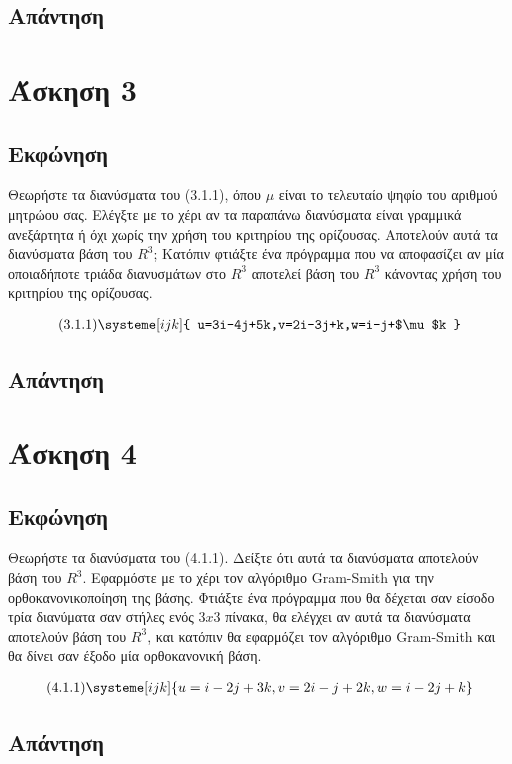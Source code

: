 \documentclass[a4paper,14pt]{extreport}
\begin{document}
\section{Απάντηση}

\chapter{Άσκηση 3}
\section{Εκφώνηση}

Θεωρήστε τα διανύσματα του (3.1.1), όπου $\mu$ είναι το τελευταίο ψηφίο του αριθμού μητρώου σας. Ελέγξτε με το χέρι αν τα παραπάνω διανύσματα είναι γραμμικά ανεξάρτητα ή όχι χωρίς την χρήση του κριτηρίου της ορίζουσας. Αποτελούν αυτά τα διανύσματα βάση του $R^{3}$; Κατόπιν φτιάξτε ένα πρόγραμμα που να αποφασίζει αν μία οποιαδήποτε τριάδα διανυσμάτων στο $R^{3}$ αποτελεί βάση του $R^{3}$ κάνοντας χρήση του κριτηρίου της ορίζουσας.

\begin{align*}
    \text{(3.1.1)}\systeme[ijk]{
        u=3i-4j+5k,v=2i-3j+k,w=i-j+$\mu$k
    }
\end{align*}

\section{Απάντηση}

\chapter{Άσκηση 4}
\section{Εκφώνηση}

Θεωρήστε τα διανύσματα του (4.1.1). Δείξτε ότι αυτά τα διανύσματα αποτελούν βάση του $R^{3}$. Εφαρμόστε με το χέρι τον αλγόριθμο Gram-Smith για την ορθοκανονικοποίηση της βάσης. Φτιάξτε ένα πρόγραμμα που θα δέχεται σαν είσοδο τρία διανύματα σαν στήλες ενός $3x3$ πίνακα, θα ελέγχει αν αυτά τα διανύσματα αποτελούν βάση του $R^{3}$, και κατόπιν θα εφαρμόζει τον αλγόριθμο Gram-Smith και θα δίνει σαν έξοδο μία ορθοκανονική βάση.

\begin{align*}
    \text{(4.1.1)}\systeme[ijk]{
        u=i-2j+3k,v=2i-j+2k,w=i-2j+k
    }
\end{align*}


\section{Απάντηση}
\end{document}

